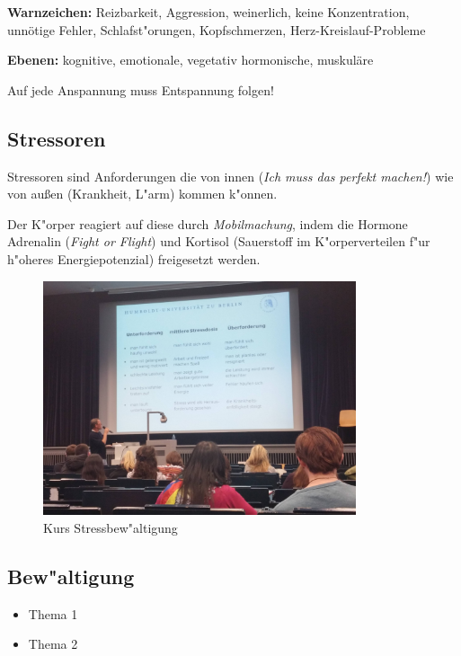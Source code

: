 \documentclass[]{scrartcl}
\begin{document}
\textbf{Warnzeichen: } Reizbarkeit, Aggression, weinerlich, keine Konzentration, unnötige Fehler, Schlafst"orungen, Kopfschmerzen, Herz-Kreislauf-Probleme 

\textbf{Ebenen:      } kognitive, emotionale, vegetativ hormonische, muskuläre

Auf jede Anspannung muss Entspannung folgen!


\subsection{Stressoren}

Stressoren sind Anforderungen die von innen (\emph{Ich muss das perfekt machen!}) wie von au\ss en (Krankheit, L"arm) kommen k"onnen. 

Der K"orper reagiert auf diese durch \emph{Mobilmachung}, indem die Hormone Adrenalin (\emph{Fight or Flight}) und Kortisol (Sauerstoff im K"orperverteilen f"ur h"oheres Energiepotenzial) freigesetzt werden. 

\begin{figure}[h]
	\centering
	\includegraphics[width=0.82\textwidth]{images/studienorga/stress.jpg}
	\caption{Kurs Stressbew"altigung}
	\label{fig:stress}
\end{figure}



\subsection{Bew"altigung}

\begin{itemize}
    \item Thema 1
    \item Thema 2
  \end{itemize}
\end{document}
